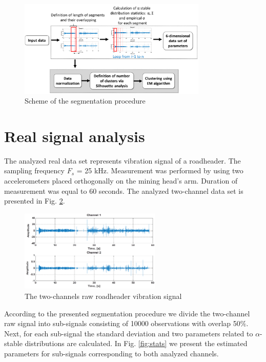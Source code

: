 \documentclass[10pt]{article}
\begin{document}
\begin{figure}[h!]
\centering
\includegraphics[width=0.8\textwidth]{wykresy/block}
\caption{Scheme of the segmentation procedure}
\label{fig:block}
\end{figure}

\section{Real signal analysis}

The analyzed real data set represents vibration signal of a roadheader. The sampling frequency $F_s$ = 25 kHz. Measurement was performed by using two accelerometers placed orthogonally on the mining head's arm. Duration of measurement was equal to 60 seconds. The analyzed two-channel data set is presented in Fig. \ref{fig:raw}. 

\begin{figure}[h!]
\centering
\includegraphics[width=0.6\textwidth]{wykresy/raw}
\caption{The two-channels raw roadheader vibration signal}
\label{fig:raw}
\end{figure}

According to the presented  segmentation procedure we divide the two-channel raw signal into sub-signals consisting of 10000 observations with overlap 50$\%$. Next, for each sub-signal the standard deviation and two parameters related to $\alpha$-stable distributions are calculated. In Fig. \ref{fig:stats} we present the estimated parameters for sub-signals corresponding to both analyzed channels.
\end{document}
